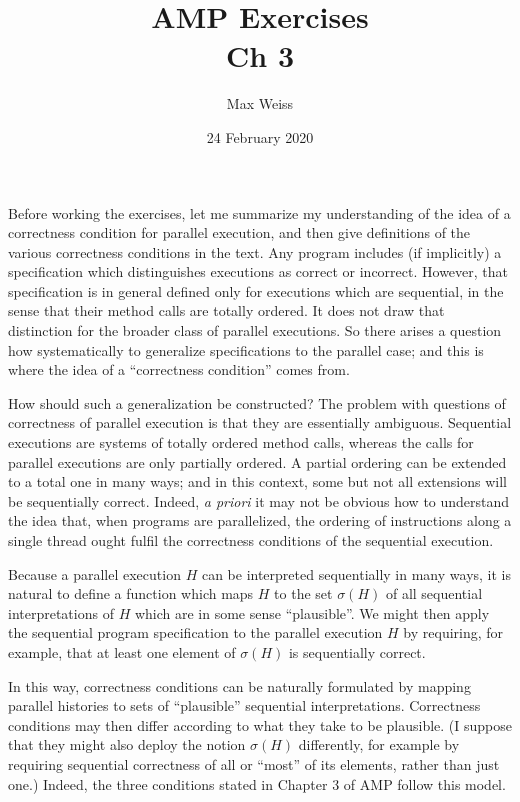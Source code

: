 \documentclass[
]{article}
\date{24 February 2020}
\title{AMP Exercises \\ Ch 3}
\author{Max Weiss}
\begin{document}
\maketitle

Before working the exercises, let me summarize my understanding of the idea of a correctness condition for parallel execution, and then give definitions of the various correctness conditions in the text.  Any program includes (if implicitly) a specification which distinguishes executions as correct or incorrect.  However, that specification is in general defined only for executions which are sequential, in the sense that their method calls are totally ordered.  It does not draw that distinction for the broader class of parallel executions.  So there arises a question how systematically to generalize specifications to the parallel case; and this is where the idea of a ``correctness condition'' comes from.

How should such a generalization be constructed?  The problem with questions of correctness of parallel execution is that they are essentially ambiguous.  Sequential executions are systems of totally ordered method calls, whereas the calls for parallel executions are only partially ordered. A partial ordering can be extended to a total one in many ways; and in this context, some but not all extensions will be sequentially correct.  Indeed, \emph{a priori} it may not be obvious how to understand the idea that, when programs are parallelized, the ordering of instructions along a single thread ought fulfil the correctness conditions of the sequential execution.  

Because a parallel execution $H$ can be interpreted sequentially in many ways, it is natural to define a function which maps $H$ to the set $\sigma(H)$ of all sequential interpretations of $H$ which are in some sense ``plausible''.  We might then apply the sequential program specification to the parallel execution $H$ by requiring, for example, that at least one element of $\sigma(H)$ is sequentially correct.

In this way, correctness conditions can be naturally formulated by mapping parallel histories to sets of ``plausible'' sequential interpretations.  Correctness conditions may then differ according to what they take to be plausible. (I suppose that they might also deploy the notion $\sigma(H)$ differently, for example by requiring sequential correctness of all or ``most'' of its elements, rather than just one.) Indeed, the three conditions stated in Chapter 3 of AMP follow this model.  
\end{document}
